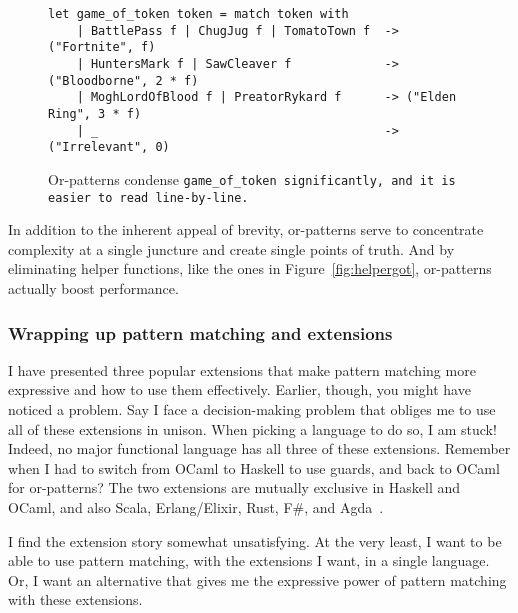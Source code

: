 \documentclass[manuscript,screen,review, 12pt, nonacm]{acmart}
\begin{document}
    \begin{figure}
    \begin{center}
    \begin{verbatim}
let game_of_token token = match token with 
    | BattlePass f | ChugJug f | TomatoTown f  -> ("Fortnite", f)
    | HuntersMark f | SawCleaver f             -> ("Bloodborne", 2 * f)
    | MoghLordOfBlood f | PreatorRykard f      -> ("Elden Ring", 3 * f)
    | _                                        -> ("Irrelevant", 0)
    \end{verbatim}
    \end{center}    
    \caption{Or-patterns condense \tt{game\_of\_token}
    significantly, and it is easier to read line-by-line.} 
    \label{fig:orgot}
    \end{figure}

    In addition to the inherent appeal of brevity, or-patterns serve to
    concentrate complexity at a single juncture and create single points of
    truth. And by eliminating helper functions, like the ones in
    Figure~\ref{fig:helpergot}, or-patterns actually boost performance.
      
    \subsubsection{Wrapping up pattern matching and extensions}
    
    I have presented three popular extensions that make pattern matching more
    expressive and how to use them effectively. Earlier, though, you might have
    noticed a problem. Say I face a decision-making problem that obliges me to
    use all of these extensions in unison. When picking a language to do so, I
    am stuck! Indeed, no major functional language has all three of these
    extensions. Remember when I had to switch from OCaml to Haskell to use
    guards, and back to OCaml for or-patterns? The two extensions are mutually
    exclusive in Haskell and OCaml, and also Scala, Erlang/Elixir, Rust, F\#,
    and Agda~\citep{haskell, ocaml, scala, erlang, elixir, rust, fsharp, agda}. 


    I find the extension story somewhat unsatisfying. At the very least, I want
    to be able to use pattern matching, with the extensions I want, in a single
    language. Or, I want an alternative that gives me the expressive power of
    pattern matching with these extensions. 
\end{document}
